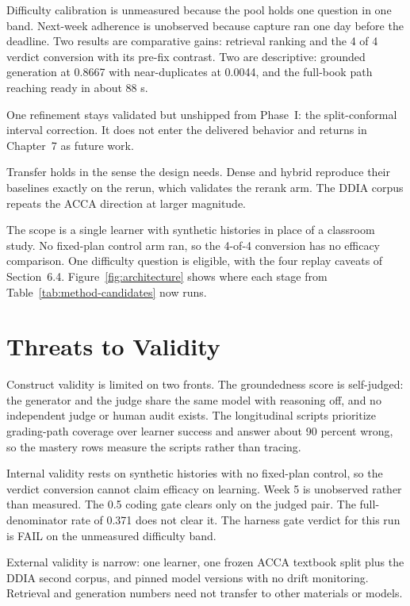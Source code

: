 Difficulty calibration is unmeasured because the pool holds one question in one band. Next-week adherence is unobserved because capture ran one day before the deadline. Two results are comparative gains: retrieval ranking and the 4 of 4 verdict conversion with its pre-fix contrast. Two are descriptive: grounded generation at 0.8667 with near-duplicates at 0.0044, and the full-book path reaching ready in about 88 s.

One refinement stays validated but unshipped from Phase~I: the split-conformal interval correction. It does not enter the delivered behavior and returns in Chapter~7 as future work.

Transfer holds in the sense the design needs. Dense and hybrid reproduce their baselines exactly on the rerun, which validates the rerank arm. The DDIA corpus repeats the ACCA direction at larger magnitude.

The scope is a single learner with synthetic histories in place of a classroom study. No fixed-plan control arm ran, so the 4-of-4 conversion has no efficacy comparison. One difficulty question is eligible, with the four replay caveats of Section~6.4. Figure~\ref{fig:architecture} shows where each stage from Table~\ref{tab:method-candidates} now runs.

\section{Threats to Validity}
Construct validity is limited on two fronts. The groundedness score is self-judged: the generator and the judge share the same model with reasoning off, and no independent judge or human audit exists. The longitudinal scripts prioritize grading-path coverage over learner success and answer about 90 percent wrong, so the mastery rows measure the scripts rather than tracing.

Internal validity rests on synthetic histories with no fixed-plan control, so the verdict conversion cannot claim efficacy on learning. Week 5 is unobserved rather than measured. The 0.5 coding gate clears only on the judged pair. The full-denominator rate of 0.371 does not clear it. The harness gate verdict for this run is FAIL on the unmeasured difficulty band.

External validity is narrow: one learner, one frozen ACCA textbook split plus the DDIA second corpus, and pinned model versions with no drift monitoring. Retrieval and generation numbers need not transfer to other materials or models.

